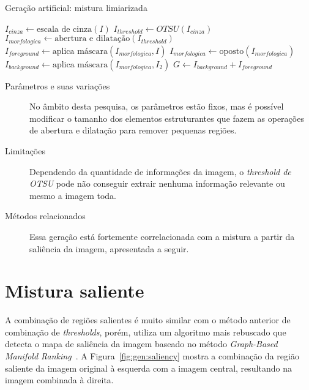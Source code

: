 \vspace{0.5cm}
\begin{algorithm}[!htbp]
  \caption{Geração artificial: mistura limiarizada}
  \label{alg:threshold}
  \SetAlgoLined

  $I_{cinza} \gets \text{escala de cinza}(I)$\;
  $I_{threshold} \gets OTSU(I_{cinza})$\;
  $I_{morfologica} \gets \text{abertura e dilatação} (I_{threshold})$\;
  $I_{foreground} \gets \text{aplica máscara}(I_{morfologica}, I) $\;
  $I_{morfologica} \gets \text{oposto}(I_{morfologica})$\;
  $I_{background} \gets \text{aplica máscara}(I_{morfologica}, I_2) $\;
  $G \gets I_{background} + I_{foreground}$\;
\end{algorithm}
\vspace{0.5cm}

\begin{description}
  \item[Parâmetros e suas variações] No âmbito desta pesquisa, os parâmetros estão fixos, mas é possível modificar o tamanho dos elementos estruturantes que fazem as operações de abertura e dilatação para remover pequenas regiões.

  \item[Limitações] Dependendo da quantidade de informações da imagem, o \textit{threshold de OTSU} pode não conseguir extrair nenhuma informação relevante ou mesmo a imagem toda.

  \item[Métodos relacionados] Essa geração está fortemente correlacionada com a mistura a partir da saliência da imagem, apresentada a seguir.

\end{description}
\section{Mistura saliente}

A combinação de regiões salientes é muito similar com o método anterior de combinação de \textit{thresholds}, porém, utiliza um algoritmo mais rebuscado que detecta o mapa de saliência da imagem baseado no método \textit{Graph-Based Manifold Ranking}~\cite{Yang2013}. A Figura~\ref{fig:gen:saliency} mostra a combinação da região saliente da imagem original à esquerda com a imagem central, resultando na imagem combinada à direita.

